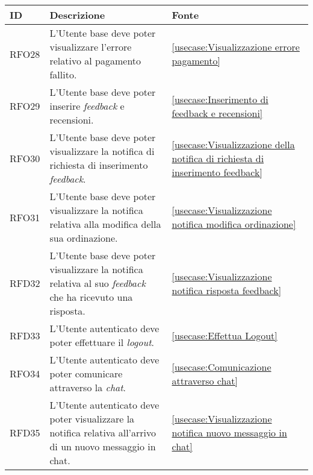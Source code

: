 \begin{table}[H]
	\renewcommand{\arraystretch}{1.5}
	\centering
	\begin{tabularx}{\textwidth}{l|X|p{2cm}}
		\textbf{ID} & \textbf{Descrizione}                                                                                              & \textbf{Fonte}                                                                        \\
		\hline
		RFO28       & L'Utente base deve poter visualizzare l'errore relativo al pagamento fallito.                                     & \autoref{usecase:Visualizzazione errore pagamento}                                    \\
		\hline
		RFO29       & L'Utente base deve poter inserire \textit{feedback} e recensioni.                                                 & \autoref{usecase:Inserimento di feedback e recensioni}                                \\
		\hline
		RFO30       & L'Utente base deve poter visualizzare la notifica di richiesta di inserimento \textit{feedback}.                  & \autoref{usecase:Visualizzazione della notifica di richiesta di inserimento feedback} \\
		\hline
		RFO31       & L'Utente base deve poter visualizzare la notifica relativa alla modifica della sua ordinazione.                   & \autoref{usecase:Visualizzazione notifica modifica ordinazione}                       \\
		\hline
		RFD32       & L'Utente base deve poter visualizzare la notifica relativa al suo \textit{feedback} che ha ricevuto una risposta. & \autoref{usecase:Visualizzazione notifica risposta feedback}                          \\
		\hline
		RFD33       & L'Utente autenticato deve poter effettuare il \textit{logout}.                                                    & \autoref{usecase:Effettua Logout}                                                     \\
		\hline
		RFO34       & L'Utente autenticato deve poter comunicare attraverso la \textit{chat}.                                           & \autoref{usecase:Comunicazione attraverso chat}                                       \\
		\hline
		RFD35       & L'Utente autenticato deve poter visualizzare la notifica relativa all'arrivo di un nuovo messaggio in chat.       & \autoref{usecase:Visualizzazione notifica nuovo messaggio in chat}                    \\

\end{tabularx}
\end{table}
